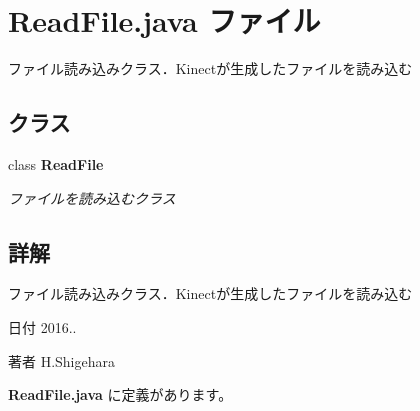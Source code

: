 \section{Read\-File.\-java ファイル}
\label{_read_file_8java}


ファイル読み込みクラス．\-Kinectが生成したファイルを読み込む  


\subsection*{クラス}
\begin{DoxyCompactItemize}
\item 
class {\bf Read\-File}
\begin{DoxyCompactList}\small\item\em ファイルを読み込むクラス \end{DoxyCompactList}\end{DoxyCompactItemize}


\subsection{詳解}
ファイル読み込みクラス．\-Kinectが生成したファイルを読み込む \begin{DoxyDate}{日付}
2016.. 
\end{DoxyDate}
\begin{DoxyAuthor}{著者}
H.\-Shigehara 
\end{DoxyAuthor}


 {\bf Read\-File.\-java} に定義があります。

